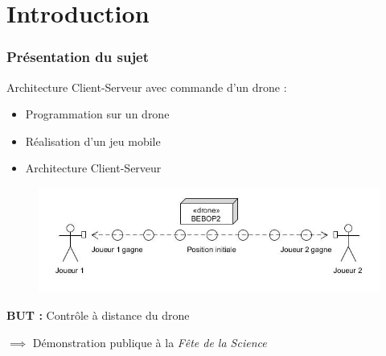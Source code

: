 \section{Introduction}
\begin{frame}
\frametitle{Présentation du sujet}
Architecture Client-Serveur avec commande d'un drone : 
\begin{itemize}
\item Programmation sur un drone
\item Réalisation d'un jeu mobile
\item Architecture Client-Serveur 
\end{itemize}
\begin{center}
\begin{figure}
\includegraphics[scale=0.4]{images/partie.jpg}
\end{figure}
\end{center}

\textbf{BUT :} Contrôle à distance du drone

$\implies$ Démonstration publique à la \textit{Fête de la Science}
\end{frame}

